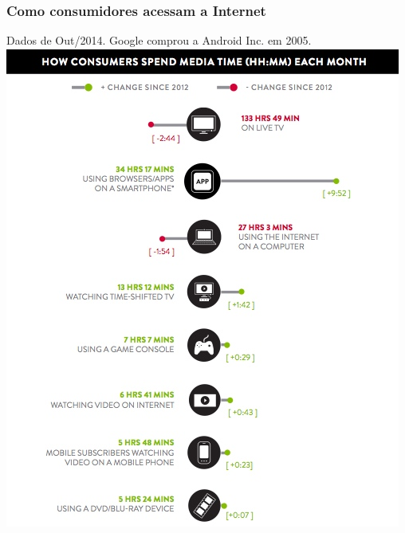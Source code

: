 \documentclass[xcolor=dvipsnames]{beamer}
\begin{document}
\begin{frame}
	\frametitle{Como consumidores acessam a Internet}
	Dados de Out/2014. Google comprou a Android Inc. em 2005.
	\vspace{0.2cm}
 	\includegraphics[scale=0.50]{time_spent.jpg}
\end{frame}
\end{document}
